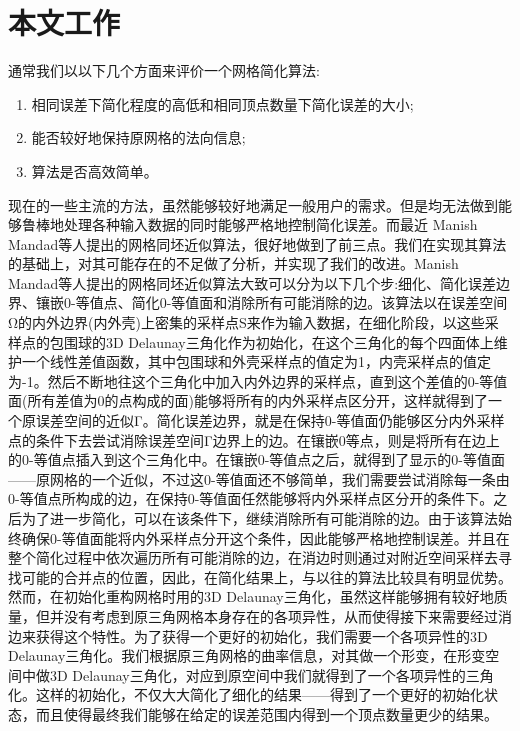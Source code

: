 \section{本文工作}
通常我们以以下几个方面来评价一个网格简化算法:
\begin{enumerate}[（1）]
\item 相同误差下简化程度的高低和相同顶点数量下简化误差的大小;
\item 能否较好地保持原网格的法向信息;
\item 算法是否高效简单。
\end{enumerate}
现在的一些主流的方法，虽然能够较好地满足一般用户的需求。但是均无法做到能够鲁棒地处理各种输入数据的同时能够严格地控制简化误差。而最近 Manish Mandad等人提出的网格同坯近似算法\cite{isotopic-appro}，很好地做到了前三点。我们在实现其算法的基础上，对其可能存在的不足做了分析，并实现了我们的改进。Manish Mandad等人提出的网格同坯近似算法大致可以分为以下几个步:细化、简化误差边界、镶嵌0-等值点、简化0-等值面和消除所有可能消除的边。该算法以在误差空间Ω的内外边界(内外壳)上密集的采样点S来作为输入数据，在细化阶段，以这些采样点的包围球的3D Delaunay三角化作为初始化，在这个三角化的每个四面体上维护一个线性差值函数，其中包围球和外壳采样点的值定为1，内壳采样点的值定为-1。然后不断地往这个三角化中加入内外边界的采样点，直到这个差值的0-等值面(所有差值为0的点构成的面)能够将所有的内外采样点区分开，这样就得到了一个原误差空间的近似Γ。简化误差边界，就是在保持0-等值面仍能够区分内外采样点的条件下去尝试消除误差空间Γ边界上的边。在镶嵌0等点，则是将所有在边上的0-等值点插入到这个三角化中。在镶嵌0-等值点之后，就得到了显示的0-等值面——原网格的一个近似，不过这0-等值面还不够简单，我们需要尝试消除每一条由0-等值点所构成的边，在保持0-等值面任然能够将内外采样点区分开的条件下。之后为了进一步简化，可以在该条件下，继续消除所有可能消除的边。由于该算法始终确保0-等值面能将内外采样点分开这个条件，因此能够严格地控制误差。并且在整个简化过程中依次遍历所有可能消除的边，在消边时则通过对附近空间采样去寻找可能的合并点的位置，因此，在简化结果上，与以往的算法比较具有明显优势。然而，在初始化重构网格时用的3D Delaunay三角化，虽然这样能够拥有较好地质量，但并没有考虑到原三角网格本身存在的各项异性，从而使得接下来需要经过消边来获得这个特性。为了获得一个更好的初始化，我们需要一个各项异性的3D Delaunay三角化。我们根据原三角网格的曲率信息，对其做一个形变，在形变空间中做3D Delaunay三角化，对应到原空间中我们就得到了一个各项异性的三角化。这样的初始化，不仅大大简化了细化的结果——得到了一个更好的初始化状态，而且使得最终我们能够在给定的误差范围内得到一个顶点数量更少的结果。

